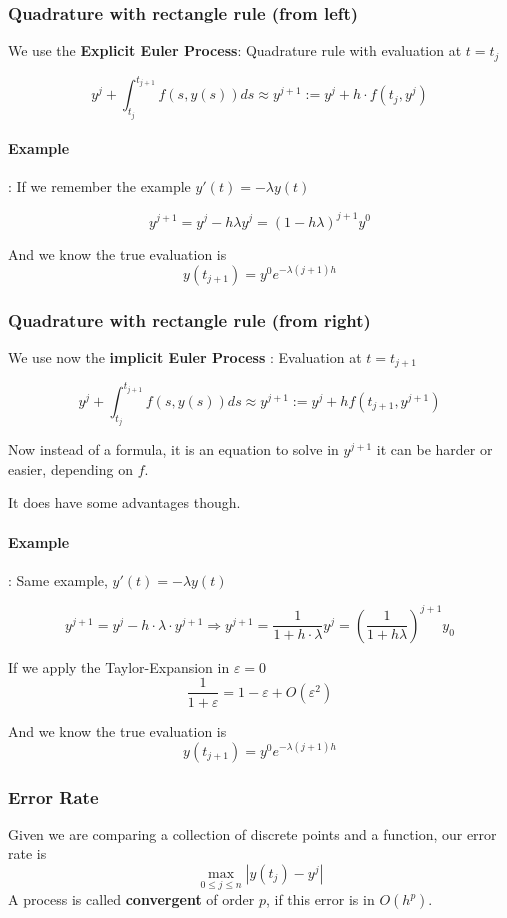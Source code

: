 \documentclass{article}
\begin{document}
\subsubsection{Quadrature with rectangle rule (from left)}
We use the \textbf{Explicit Euler Process}: Quadrature rule with evaluation at $t = t_j$

\[y^j + \int_{t_j}^{t_{j+1}}f(s,y(s))ds \approx y^{j+1} := y^j + h\cdot f(t_j, y^j)\]

\paragraph{Example}:
If we remember the example $y'(t) = -\lambda y(t)$ 

\[y^{j+1} = y^j - h\lambda y^j = (1-h\lambda)^{j+1}y^0\]

And we know the true evaluation is
\[y(t_{j+1}) = y^0 e^{-\lambda (j+1)h}\]

\subsubsection{Quadrature with rectangle rule (from right)}
We use now the \textbf{implicit Euler Process} : Evaluation at $t = t_{j+1}$

\[y^j + \int_{t_j}^{t_{j+1}}f(s,y(s))ds \approx y^{j+1} := y^{j} + hf(t_{j+1}, y^{j+1})\]

Now instead of a formula, it is an equation to solve in $y^{j+1}$ it can be harder or easier, depending on $f$.

It does have some advantages though.

\paragraph{Example}: Same example, $y'(t) = -\lambda y(t)$

\[y^{j+1} = y^j - h \cdot \lambda \cdot y^{j+1} \Rightarrow y^{j+1} = \frac{1}{1+h\cdot \lambda}y^j = \left(\frac{1}{1+h\lambda}\right)^{j+1}y_0\]

If we apply the Taylor-Expansion in $\varepsilon = 0$
\[\frac{1}{1+\varepsilon} = 1-\varepsilon + O(\varepsilon^2)\]

And we know the true evaluation is
\[y(t_{j+1}) = y^0 e^{-\lambda (j+1)h}\]

\subsubsection{Error Rate}
Given we are comparing a collection of discrete points and a function, our error rate is 
\[\max_{0\leq j \leq n} |y(t_j) - y^j|\]
A process is called \textbf{convergent} of order $p$, if this error is in $O(h^p)$.
\end{document}
